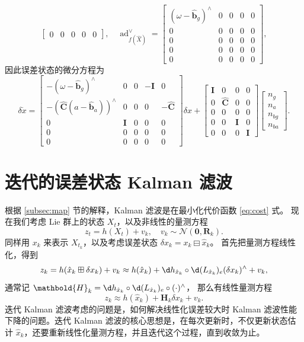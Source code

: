 \documentclass[fontset=none,zihao=-4]{Notes}
\DeclareMathOperator\ad{ad}
\newcommand{\mat}[1]{\mathbold{#1}}
\begin{document}
\begin{example}[IMU 系统]
\[\begin{bmatrix}
        0 & 0 & 0 & 0 & 0
      \end{bmatrix},\quad 
      \ad_{f(\hat X)}^\vee=\begin{bmatrix}
        (\omega-\hat{\mat b}_g)^\wedge & 0 & 0 & 0 & 0 \\
        0 & 0 & 0 & 0 & 0\\
        0 & 0 & 0 & 0 & 0\\
        0 & 0 & 0 & 0 & 0\\
        0 & 0 & 0 & 0 & 0
      \end{bmatrix},
  \]
  因此误差状态的微分方程为
  \[
      \delta\dot{x}=\begin{bmatrix}
        -(\omega-\hat{\mat b}_g)^\wedge & 0 & 0 & -\mat I & 0\\
        -(\hat{\mat C}(a-\hat{\mat b}_a))^\wedge & 0 & 0 & 0 & -\hat{\mat C}\\
        0 & \mat I & 0 & 0 & 0\\
        0 & 0 & 0 & 0 & 0\\
        0 & 0 & 0 & 0 & 0
      \end{bmatrix}\delta x+\begin{bmatrix}
        \mat I & 0 & 0 & 0 \\
        0 & \hat{\mat C} & 0 & 0\\
        0 & 0 & 0 & 0\\
        0 & 0 & \mat I & 0\\
        0 & 0 & 0 & \mat I
      \end{bmatrix}\begin{bmatrix}
        n_g\\
        n_a\\
        n_{bg}\\
        n_{ba}
      \end{bmatrix}.
  \]
\end{example}

\section{迭代的误差状态 Kalman 滤波}

根据 \ref{subsec:map} 节的解释，Kalman 滤波是在最小化代价函数 \eqref{eq:cost} 式。
现在我们考虑 Lie 群上的状态 $X_t$，以及非线性的量测方程
\[
  z_t=h(X_t)+v_k, \quad v_k\sim \mathcal{N}(\mat 0,\mat R_k).
\]
同样用 $x_k$ 来表示 $X_{t_k}$，以及考虑误差状态 $\delta x_k=x_k\boxminus \hat x_k$。
首先把量测方程线性化，得到
\[
  z_k=h(\hat x_k\boxplus \delta x_k)+v_k\approx 
  h(\hat x_k)+\d h_{\hat x_k}\circ \d (L_{\hat x_k})_e(\delta x_k)^\wedge+v_k,
\]
通常记 $\mat H_k=\d h_{\hat x_k}\circ \d (L_{\hat x_k})_e\circ (\cdot)^\wedge$，
那么有线性量测方程
\[
  z_k\approx h(\hat x_k)+\mat H_k \delta x_k+v_k.
\]
迭代 Kalman 滤波考虑的问题是，如何解决线性化误差较大时 Kalman 滤波性能下降的问题。迭代 Kalman 滤波的核心思想是，在每次更新时，不仅更新状态估计 $\hat x_k$，还要重新线性化量测方程，并且迭代这个过程，直到收敛为止。
\end{document}
